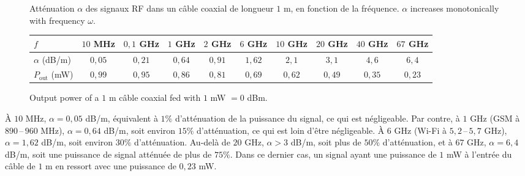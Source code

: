 \begin{figure}[h!]
  \centering
  \caption*{\small Atténuation $\alpha$ des signaux RF dans un câble coaxial de
  longueur $1$ m, en fonction de la fréquence. $\alpha$ increases monotonically
  with frequency $\omega$.}
\end{figure}

\begin{figure}[h!]
  \centering
  \small
  \begin{tabular}{lccccccccc}
    \toprule
    $f$ & $10$ MHz & $0{,}1$ GHz & $1$ GHz & $2$ GHz & $6$ GHz & $10$ GHz & $20$ GHz & $40$ GHz & $67$ GHz \\
    \midrule
    $\alpha$ (dB/m) & $0{,}05$ & $0{,}21$ & $0{,}64$ & $0{,}91$ & $1{,}62$ & $2{,}1$ & $3{,}1$ & $4{,}6$ & $6{,}4$ \\
    $P_{\text{out}}$ (mW) & $0{,}99$ & $0{,}95$ & $0{,}86$ & $0{,}81$ & $0{,}69$ & $0{,}62$ & $0{,}49$ & $0{,}35$ & $0{,}23$ \\
    \bottomrule
  \end{tabular}
  \caption*{\small Output power of a $1$ m câble coaxial fed with
  $1$ mW $=0$ dBm.}
\end{figure}

\begin{example}
  À $10$ MHz, $\alpha = 0{,}05$ dB/m, équivalent à $1\%$ d'atténuation de la
  puissance du signal, ce qui est négligeable. Par contre, à
  $1$ GHz (GSM à $890$\,--\,$960$ MHz), $\alpha = 0{,}64$ dB/m, soit environ
  $15\%$ d'atténuation, ce qui est loin d'être négligeable. À $6$ GHz (Wi-Fi à
  $5{,}2$\,--\,$5{,}7$ GHz), $\alpha = 1{,}62$ dB/m, soit environ $30\%$
  d'atténuation. Au-delà de $20$ GHz, $\alpha > 3$ dB/m, soit plus de $50\%$
  d'atténuation, et à $67$ GHz, $\alpha = 6{,}4$ dB/m, soit une puissance de
  signal atténuée de plus de $75\%$. Dans ce dernier cas, un signal ayant une
  puissance de $1$ mW à l'entrée du câble de $1$ m en ressort avec une
  puissance de $0{,}23$ mW.
\end{example}


